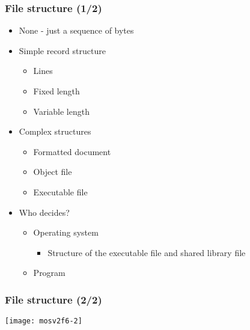 \documentclass[CJKutf8,dvipsnames,table]{beamer}
\begin{document}
\begin{CJK*}{UTF8}{song}
  \begin{frame}
    \frametitle{File structure (1/2)} \pause
    \begin{itemize}\parskip=0pt
    \item None - just a sequence of bytes \pause
    \item Simple record structure \pause
      \begin{itemize}\parskip=0pt
      \item Lines \pause
      \item Fixed length \pause
      \item Variable length \pause
      \end{itemize}
    \item Complex structures
      \begin{itemize}\parskip=0pt
      \item Formatted document \pause
      \item Object file \pause
      \item Executable file \pause
      \end{itemize}
    \item Who decides? \pause
      \begin{itemize}\parskip=0pt
      \item Operating system \pause
        \begin{itemize}\parskip=0pt
        \item Structure of the executable file and shared library file \pause
        \end{itemize}
      \item Program
      \end{itemize}
    \end{itemize}
  \end{frame}

  \begin{frame}
    \frametitle{File structure (2/2)} \pause
    \begin{center}
      \texttt{[image: mosv2f6-2]}
    \end{center}
  \end{frame}


\end{CJK*}
\end{document}
